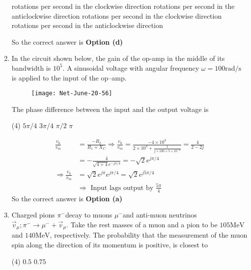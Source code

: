 \begin{enumerate}
\begin{tasks}
	 rotations per second in the clockwise direction
	 rotations per second in the anticlockwise direction
	 rotations per second in the clockwise direction
	 rotations per second in the anticlockwise direction
\end{tasks}
\begin{answer}
		So the correct answer is \textbf{Option (d)}
\end{answer}
\item  In the circuit shown below, the gain of the op-amp in the middle of its bandwidth is $10^{5}$. A sinusoidal voltage with angular frequency $\omega=100 \mathrm{rad} / \mathrm{s}$ is applied to the input of the op--amp.
\begin{figure}[H]
	\centering
	\texttt{[image: Net-June-20-56]}
\end{figure}
The phase difference between the input and the output voltage is
 \begin{tasks}(4)
	\task[\textbf{a.}]$5 \pi / 4$
	\task[\textbf{b.}]$3 \pi / 4$
	\task[\textbf{c.}]$\pi / 2$
	\task[\textbf{d.}]$\pi$ 
\end{tasks}
\begin{answer}
	\begin{align*}
	\frac{v_{0}}{v_{m}}&=\frac{-R_{2}}{R_{1}+X_{C}} \Rightarrow \frac{v_{0}}{v_{m}}=\frac{-4 \times 10^{3}}{2 \times 10^{3}+\frac{1}{j \times 100 \times 5 \times 10^{-6}}}=\frac{4}{2-2 j}\\&=-\frac{4}{\sqrt{4+4} e^{-j \pi / 4}}=-\sqrt{2} e^{j \pi / 4}\\
	\Rightarrow \frac{v_{0}}{v_{m}}&=\sqrt{2} e^{j \pi} e^{j \pi / 4}=\sqrt{2} e^{j 5 \pi / 4}\\
	&\Rightarrow \text { Input lags output by } \frac{5 \pi}{4}
	\end{align*}
	So the correct answer is \textbf{Option (a)}
\end{answer}
\item Charged pions $\pi^{-}$decay to muons $\mu^{-}$and anti-muon neutrinos $\vec{v}_{\mu} ; \pi^{-} \rightarrow \mu^{-}+\vec{v}_{\mu}$. Take the rest masses of a muon and a pion to be $105 \mathrm{MeV}$ and $140 \mathrm{MeV}$, respectively. The probability that the measurement of the muon spin along the direction of its momentum is positive, is closest to
 \begin{tasks}(4)
	\task[\textbf{a.}]$0.5$
	\task[\textbf{b.}]$0.75$
\end{tasks}

\end{enumerate}
